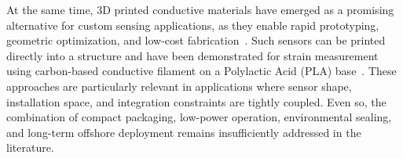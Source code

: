 At the same time, 3D printed conductive materials have emerged as a promising alternative for custom sensing applications, as they enable rapid prototyping, geometric optimization, and low-cost fabrication~\cite{G.O.A.T, 3DprintStrain, 3DprintWheatstoneStrain}. Such sensors can be printed directly into a structure and have been demonstrated for strain measurement using carbon-based conductive filament on a Polylactic Acid (PLA) base~\cite{munasinghe_3dprinted_strain_2020}. These approaches are particularly relevant in applications where sensor shape, installation space, and integration constraints are tightly coupled. Even so, the combination of compact packaging, low-power operation, environmental sealing, and long-term offshore deployment remains insufficiently addressed in the literature.
